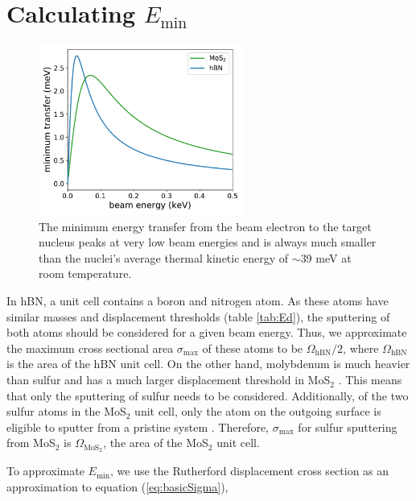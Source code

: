 \documentclass{article}
\begin{document}
\section{Calculating $E_\text{min}$}
\label{app:Emin}

\begin{figure}[H]
  \centering
  \includegraphics[width=0.6\textwidth]{figS5.pdf}
  \caption{
    The minimum energy transfer from the beam electron to the target nucleus
    peaks at very low beam energies and is always much smaller than the
    nuclei's average thermal kinetic energy of $\sim$39 meV at room
    temperature. 
  }
  \label{fig:Emin}
\end{figure}

In hBN, a unit cell contains a boron and nitrogen atom.
As these atoms have similar masses and displacement thresholds (table
\ref{tab:Ed}), the sputtering of both atoms should be considered for a given
beam energy.
Thus, we approximate the maximum cross sectional area $\sigma_\text{max}$ of
these atoms to be $\Omega_\text{hBN}/2$, where $\Omega_\text{hBN}$ is the area
of the hBN unit cell.
On the other hand, molybdenum is much heavier than sulfur and has a much larger
displacement threshold in MoS$_2$ \cite{Komsa2012}.  
This means that only the sputtering of sulfur needs to be considered.
Additionally, of the two sulfur atoms in the MoS$_2$ unit cell, only the atom
on the outgoing surface is eligible to sputter from a pristine system
\cite{Komsa2012}.
Therefore, $\sigma_\text{max}$ for sulfur sputtering from MoS$_2$ is
$\Omega_\text{MoS$_2$}$, the area of the MoS$_2$ unit cell.

To approximate $E_\text{min}$, we use the Rutherford displacement cross section
\cite{Thornton2004, Sakurai2011, Yoshimura2018} as an approximation to equation
(\ref{eq:basicSigma}),
\end{document}
